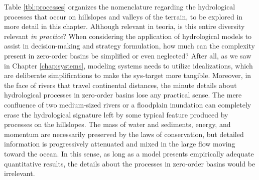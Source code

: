 \documentclass[./main_en.tex]{subfiles}
\begin{document}
\par Table \ref{tbl:processes} organizes the nomenclature regarding the hydrological processes that occur on hillslopes and valleys of the terrain, to be explored in more detail in this chapter. Although relevant in \gls{teoria}, is this entire diversity relevant \textit{in practice}? When considering the application of hydrological models to assist in decision-making and strategy formulation, how much can the complexity present in zero-order basins be simplified or even neglected? After all, as we saw in Chapter \ref{chap:systems}, modeling systems needs to utilize idealizations, which are deliberate simplifications to make the \gls{sys-target} more tangible. Moreover, in the face of rivers that travel continental distances, the minute details about hydrological processes in zero-order basins lose any practical sense. The mere confluence of two medium-sized rivers or a floodplain inundation can completely erase the hydrological signature left by some typical feature produced by processes on the hillslopes. The mass of water and sediments, energy, and momentum are necessarily preserved by the laws of conservation, but detailed information is progressively attenuated and mixed in the large flow moving toward the ocean. In this sense, as long as a \gls{model} presents empirically adequate quantitative results, the details about the processes in zero-order basins would be irrelevant.
\end{document}
